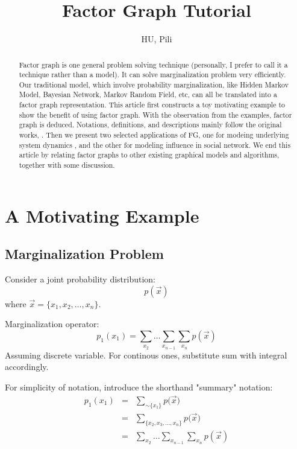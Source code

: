 \documentclass[11pt,a4paper]{article}
\author{HU, Pili}
\title{Factor Graph Tutorial}
\begin{document}
\maketitle

\begin{abstract}
	Factor graph is one general problem solving technique
	(personally, I prefer to call it a technique rather than a model). 
	It can solve marginalization problem very efficiently. 
	Our traditional model, which involve probability marginalization, 
	like Hidden Markov Model, Bayesian Network, Markov Random Field,
	etc, can all be translated into a factor graph 
	representation. This article first constructs a toy motivating 
	example to show the benefit of using factor graph. With the 
	observation from the examples, factor graph is deduced. 
	Notations, definitions, and descriptions mainly follow the original 
	works, \cite{kschischang2001factor}
	\cite{frey1997factor}. Then we present two selected applications 
	of FG, one for modeing underlying system dynamics\cite{mirowski2009dynamic}
	, and the other
	for modeling influence in social network\cite{wang2011-dynamic}. 
	We end this article by relating factor graphs to other existing 
	graphical models and algorithms, together with some discussion. 
\end{abstract}

\pagebreak
\tableofcontents
\pagebreak

\section{A Motivating Example}

\subsection{Marginalization Problem}

Consider a joint probability distribution:
\begin{equation}
	p(\vec{x})
\end{equation}
where $\vec{x}=\{x_1,x_2, \ldots, x_n\}$. 

Marginalization operator:
\begin{equation}
	p_1(x_1) = \sum_{x_2} \ldots \sum_{x_{n-1}} \sum_{x_n}p(\vec{x})
\end{equation}
Assuming discrete variable. For continous ones, substitute sum 
with integral accordingly. 

For simplicity of notation, introduce the shorthand "summary" notation:
\begin{eqnarray}
	p_1(x_1) &=& \sum_{\sim\{x_1\}}{p(\vec{x}}) \\
	&=& \sum_{\{x_2,x_3,\ldots,x_n\}}{p(\vec{x}}) \\
	&=& \sum_{x_2} \ldots \sum_{x_{n-1}} \sum_{x_n}p(\vec{x}) 
	\label{eq:marginal}
\end{eqnarray}
\end{document}
